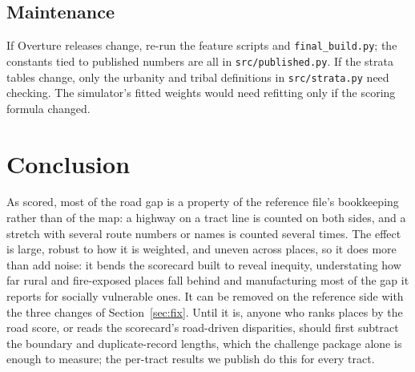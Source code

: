 \documentclass[10pt,twocolumn,a4paper]{article}
\newcommand{\code}[1]{\texttt{\small #1}}
\begin{document}
\subsection{Maintenance}
If Overture releases change, re-run the feature scripts and \code{final\_build.py}; the constants tied to published
numbers are all in \code{src/published.py}. If the strata tables change, only the urbanity and tribal definitions in
\code{src/strata.py} need checking. The simulator's fitted weights would need refitting only if the scoring formula changed.

\section{Conclusion}
As scored, most of the road gap is a property of the reference file's bookkeeping rather than of the map: a highway on a
tract line is counted on both sides, and a stretch with several route numbers or names is counted several times. The
effect is large, robust to how it is weighted, and uneven across places, so it does more than add noise: it bends the
scorecard built to reveal inequity, understating how far rural and fire-exposed places fall behind and manufacturing most
of the gap it reports for socially vulnerable ones. It can be removed on the reference side with the three changes of
Section~\ref{sec:fix}. Until it is, anyone who ranks places by the road score, or reads the scorecard's road-driven
disparities, should first subtract the boundary and duplicate-record lengths, which the challenge package alone is
enough to measure; the per-tract results we publish do this for every tract.
\end{document}
